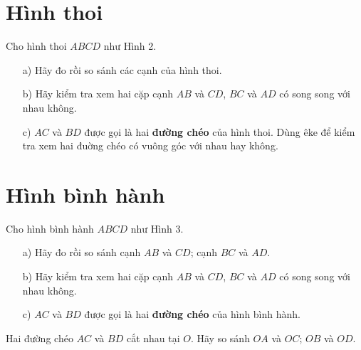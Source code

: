 \documentclass[12pt]{article}
\begin{document}
\section{Hình thoi}
\begin{paracol}{2}
Cho hình thoi \(ABCD\) như Hình 2.
\begin{itemize}
  \item[a)] Hãy đo rồi so sánh các cạnh của hình thoi.
  \item[b)] Hãy kiểm tra xem hai cặp cạnh \(AB\) và \(CD\), \(BC\) và \(AD\) có song song với nhau không.
  \item[c)] \(AC\) và \(BD\) được gọi là hai \textbf{đường chéo} của hình thoi. Dùng êke để kiểm tra xem hai đuờng chéo có vuông góc với nhau hay không.
\end{itemize}
\switchcolumn
\centering
{}
\vspace{-\baselineskip}
\end{paracol}
\section{Hình bình hành}
\begin{paracol}{2}
Cho hình bình hành \(ABCD\) như Hình 3.
\begin{itemize}
  \item[a)] Hãy đo rồi so sánh cạnh \(AB\) và \(CD\); cạnh \(BC\) và \(AD\).
  \item[b)] Hãy kiểm tra xem hai cặp cạnh \(AB\) và \(CD\), \(BC\) và \(AD\) có song song với nhau không.
  \item[c)] \(AC\) và \(BD\) được gọi là hai \textbf{đường chéo} của hình bình hành.
\end{itemize}
Hai đường chéo \(AC\) và \(BD\) cắt nhau tại \(O\). Hãy so sánh \(OA\) và \(OC\); \(OB\) và \(OD\).
\switchcolumn
\centering
{}
\vspace{-\baselineskip}
\end{paracol}
\end{document}
